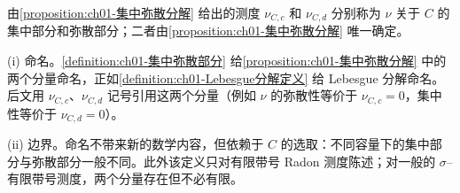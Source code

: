 \documentclass[../../main.tex]{subfiles}%
\begin{document}
\begin{definition}\label{definition:ch01-集中弥散部分}
由\cref{proposition:ch01-集中弥散分解} 给出的测度 $\nu_{C,c}$ 和 $\nu_{C,d}$ 分别称为 $\nu$ 关于 $C$ 的集中部分和弥散部分；二者由\cref{proposition:ch01-集中弥散分解} 唯一确定。
\end{definition}

\begin{remark}\label{remark:ch01-集中弥散部分动机}
(i) 命名。\cref{definition:ch01-集中弥散部分} 给\cref{proposition:ch01-集中弥散分解} 中的两个分量命名，正如\cref{definition:ch01-Lebesgue分解定义} 给 Lebesgue 分解命名。后文用 $\nu_{C,c}$、$\nu_{C,d}$ 记号引用这两个分量（例如 $\nu$ 的弥散性等价于 $\nu_{C,c}=0$，集中性等价于 $\nu_{C,d}=0$）。

(ii) 边界。命名不带来新的数学内容，但依赖于 $C$ 的选取：不同容量下的集中部分与弥散部分一般不同。此外该定义只对有限带号 Radon 测度陈述；对一般的 $\sigma$--有限带号测度，两个分量存在但不必有限。
\end{remark}
\end{document}
